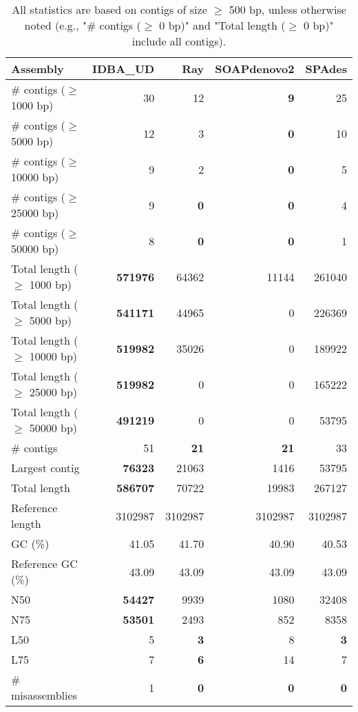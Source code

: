 \documentclass[12pt,a4paper]{article}
\begin{document}
\begin{table}[ht]
\begin{center}
\caption{All statistics are based on contigs of size $\geq$ 500 bp, unless otherwise noted (e.g., "\# contigs ($\geq$ 0 bp)" and "Total length ($\geq$ 0 bp)" include all contigs).}
\begin{tabular}{|l*{4}{|r}|}
\hline
Assembly & IDBA\_UD & Ray & SOAPdenovo2 & SPAdes \\ \hline
\# contigs ($\geq$ 1000 bp) & 30 & 12 & {\bf 9} & 25 \\ \hline
\# contigs ($\geq$ 5000 bp) & 12 & 3 & {\bf 0} & 10 \\ \hline
\# contigs ($\geq$ 10000 bp) & 9 & 2 & {\bf 0} & 5 \\ \hline
\# contigs ($\geq$ 25000 bp) & 9 & {\bf 0} & {\bf 0} & 4 \\ \hline
\# contigs ($\geq$ 50000 bp) & 8 & {\bf 0} & {\bf 0} & 1 \\ \hline
Total length ($\geq$ 1000 bp) & {\bf 571976} & 64362 & 11144 & 261040 \\ \hline
Total length ($\geq$ 5000 bp) & {\bf 541171} & 44965 & 0 & 226369 \\ \hline
Total length ($\geq$ 10000 bp) & {\bf 519982} & 35026 & 0 & 189922 \\ \hline
Total length ($\geq$ 25000 bp) & {\bf 519982} & 0 & 0 & 165222 \\ \hline
Total length ($\geq$ 50000 bp) & {\bf 491219} & 0 & 0 & 53795 \\ \hline
\# contigs & 51 & {\bf 21} & {\bf 21} & 33 \\ \hline
Largest contig & {\bf 76323} & 21063 & 1416 & 53795 \\ \hline
Total length & {\bf 586707} & 70722 & 19983 & 267127 \\ \hline
Reference length & 3102987 & 3102987 & 3102987 & 3102987 \\ \hline
GC (\%) & 41.05 & 41.70 & 40.90 & 40.53 \\ \hline
Reference GC (\%) & 43.09 & 43.09 & 43.09 & 43.09 \\ \hline
N50 & {\bf 54427} & 9939 & 1080 & 32408 \\ \hline
N75 & {\bf 53501} & 2493 & 852 & 8358 \\ \hline
L50 & 5 & {\bf 3} & 8 & {\bf 3} \\ \hline
L75 & 7 & {\bf 6} & 14 & 7 \\ \hline
\# misassemblies & 1 & {\bf 0} & {\bf 0} & {\bf 0} \\ \hline

\end{tabular}
\end{center}
\end{table}
\end{document}
